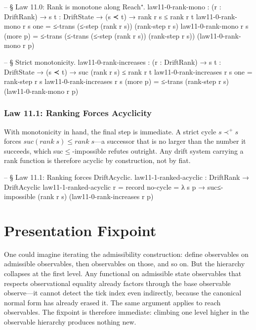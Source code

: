 \documentclass[11pt,a4paper]{book}
\def\texttt#1{#1}%
\begin{document}
\begin{code}
-- § Law 11.0: Rank is monotone along Reach⁺.
law11-0-rank-mono : (r : DriftRank) → {s t : DriftState} → (s ≺ t) → rank r s ≤ rank r t
law11-0-rank-mono r {s} one =
  ≤-trans (≤-step (rank r s)) (rank-step r s)
law11-0-rank-mono r {s} (more p) =
  ≤-trans
    (≤-trans (≤-step (rank r s)) (rank-step r s))
    (law11-0-rank-mono r p)

-- § Strict monotonicity.
law11-0-rank-increases : (r : DriftRank) → {s t : DriftState} → (s ≺ t) → suc (rank r s) ≤ rank r t
law11-0-rank-increases r {s} one = rank-step r s
law11-0-rank-increases r {s} (more p) =
  ≤-trans (rank-step r s) (law11-0-rank-mono r p)
\end{code}

\subsection{Law 11.1: Ranking Forces Acyclicity}

With monotonicity in hand, the final step is immediate. A strict cycle $s \prec^+ s$ forces $\texttt{suc (rank}\;s\texttt{)} \le \texttt{rank}\;s$---a successor that is no larger than the number it succeeds, which \texttt{suc$\le$-impossible} refutes outright. Any drift system carrying a rank function is therefore acyclic by construction, not by fiat.

\begin{code}
-- § Law 11.1: Ranking forces DriftAcyclic.
law11-1-ranked-acyclic : DriftRank → DriftAcyclic
law11-1-ranked-acyclic r =
  record
    { no-cycle =
        λ s p →
          suc≤-impossible (rank r s) (law11-0-rank-increases r p)
    }
\end{code}

\chapter{Presentation Fixpoint}

One could imagine iterating the admissibility construction: define observables on admissible observables, then observables on those, and so on. But the hierarchy collapses at the first level. Any functional on admissible state observables that respects observational equality already factors through the base observable \texttt{observe}---it cannot detect the tick index even indirectly, because the canonical normal form has already erased it. The same argument applies to reach observables. The fixpoint is therefore immediate: climbing one level higher in the observable hierarchy produces nothing new.
\end{document}
